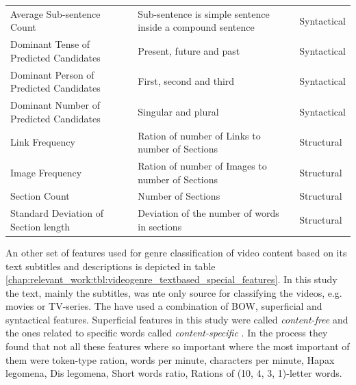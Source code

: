 \begin{table}[t]
\begin{tabular}{p{4cm}p{7cm}p{3cm}}
        Average Sub-sentence Count & Sub-sentence is simple sentence inside a compound sentence & Syntactical \\
        Dominant Tense of  Predicted Candidates & Present, future and past & Syntactical \\
        Dominant Person of  Predicted Candidates & First, second and third & Syntactical \\
        Dominant Number of  Predicted Candidates & Singular and plural & Syntactical \\
		Link Frequency & Ration of number of Links to number of Sections  & Structural \\
        Image Frequency & Ration of number of Images to number of Sections  & Structural \\
        Section Count & Number of Sections & Structural \\
        Standard Deviation of Section length & Deviation of the number of words in sections & Structural \\
		\hline
	\end{tabular}
\end{table}

An other set of features used for genre classification of video content based on its text subtitles and descriptions is depicted in table \ref{chap:relevant_work:tbl:videogenre_textbased_special_features}. In this study the text, mainly the subtitles, was nte only source for classifying the videos, e.g. movies or TV-series. The have used a combination of BOW, superficial and syntactical features. Superficial features in this study were called \textit{content-free} and the ones related to specific words called \textit{content-specific} \parencite{lee2017text}. In the process they found that not all these features where so important where the most important of them were token-type ration, words per minute, characters per minute, Hapax legomena, Dis legomena, Short words ratio, Rations of  (10, 4, 3, 1)-letter words. 

